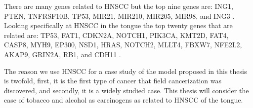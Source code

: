 \documentclass[\main/thesis.tex]{subfiles}
\begin{document}
There are many genes related to HNSCC but the top nine genes are: ING1, PTEN, TNFRSF10B, TP53, MIR21, MIR210, MIR205, MIR98, and ING3 \cite{malacards.org_2021}. Looking specifically at HNSCC in the tongue the top twenty genes that are related are: TP53, FAT1, CDKN2A, NOTCH1, PIK3CA, KMT2D, FAT4, CASP8, MYH9, EP300, NSD1, HRAS, NOTCH2, MLLT4, FBXW7, NFE2L2, AKAP9, GRIN2A, RB1, and CDH11 \cite{malacards.org_2021}. 

The reason we use HNSCC for a case study of the model proposed in this thesis is twofold, first, it is the first type of cancer that field cancerization was discovered, and secondly, it is a widely studied case. This thesis will consider the case of tobacco and alcohol as carcinogens as related to HNSCC of the tongue. 
\end{document}
